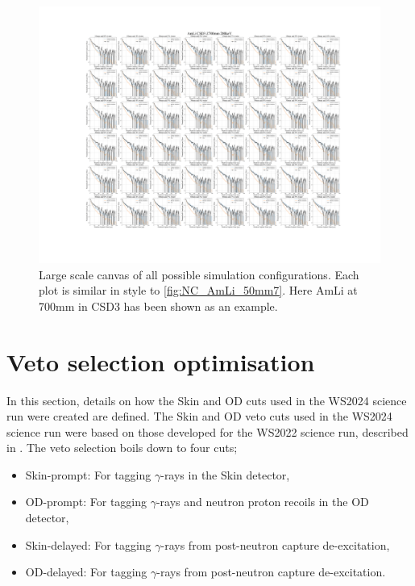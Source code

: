 \begin{figure}
	\centering
	\includegraphics[width=\linewidth]{figures/VetoEfficiency/AmLi_CSD3_Z700mm_200keV.png}
	\caption{Large scale canvas of all possible simulation configurations. Each plot is similar in style to \autoref{fig:NC_AmLi_50mm7}. Here AmLi at 700mm in CSD3 has been shown as an example.}
	\label{fig:NC_Canvas}
\end{figure}


\section{Veto selection optimisation}
In this section, details on how the Skin and OD cuts used in the WS2024 science run were created are defined. The Skin and OD veto cuts used in the WS2024 science run were based on those developed for the WS2022 science run, described in \cite{LZCollaboration:2024lux}.
The veto selection boils down to four cuts;
\begin{itemize}
	\item Skin-prompt: For tagging $\gamma$-rays in the Skin detector,
	\item OD-prompt: For tagging $\gamma$-rays and neutron proton recoils in the OD detector,
	\item Skin-delayed: For tagging $\gamma$-rays from post-neutron capture de-excitation,
	\item OD-delayed: For tagging $\gamma$-rays from post-neutron capture de-excitation.
\end{itemize}

